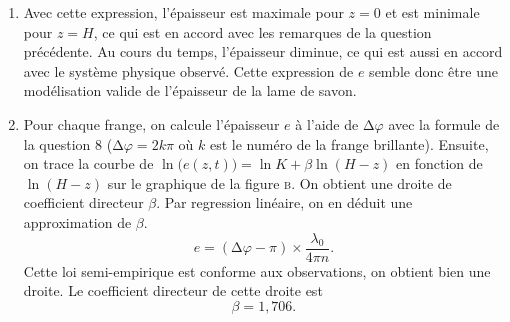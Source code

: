 \documentclass[a4paper, 11pt]{article}
\begin{document}
\begin{multicols}{2}
\begin{enumerate}[label=(\arabic*),start=8]
			\item Avec cette expression, l'épaisseur est maximale pour $z = 0$ et est minimale pour $z = H$, ce qui est en accord avec les remarques de la question précédente. Au cours du temps, l'épaisseur diminue, ce qui est aussi en accord avec le système physique observé.
				Cette expression de $e$\/ semble donc être une modélisation valide de l'épaisseur de la lame de savon.
			\item Pour chaque frange, on calcule l'épaisseur $e$ à l'aide de $\mathrm{\Delta}\varphi$\/ avec la formule de la question 8 ($\mathrm{\Delta}\varphi = 2k\pi$\/ où $k$\/ est le numéro de la frange brillante). Ensuite, on trace la courbe de $\ln\!\big(e(z,t)\big) = \ln K + \beta\ln(H-z)$ en fonction de $\ln(H-z)$\/ sur le graphique de la figure \textsc{b}. On obtient une droite de coefficient directeur $\beta$. Par regression linéaire, on en déduit une approximation de $\beta$. \[
					e = (\mathrm{\Delta}\varphi - \pi) \times \frac{\lambda_0}{4\pi n}
			.\] Cette loi semi-empirique est conforme aux observations, on obtient bien une droite. Le coefficient directeur de cette droite est \[
			\beta = 1{,}706
			.\]
		\end{enumerate}
	\end{multicols}
\end{document}
